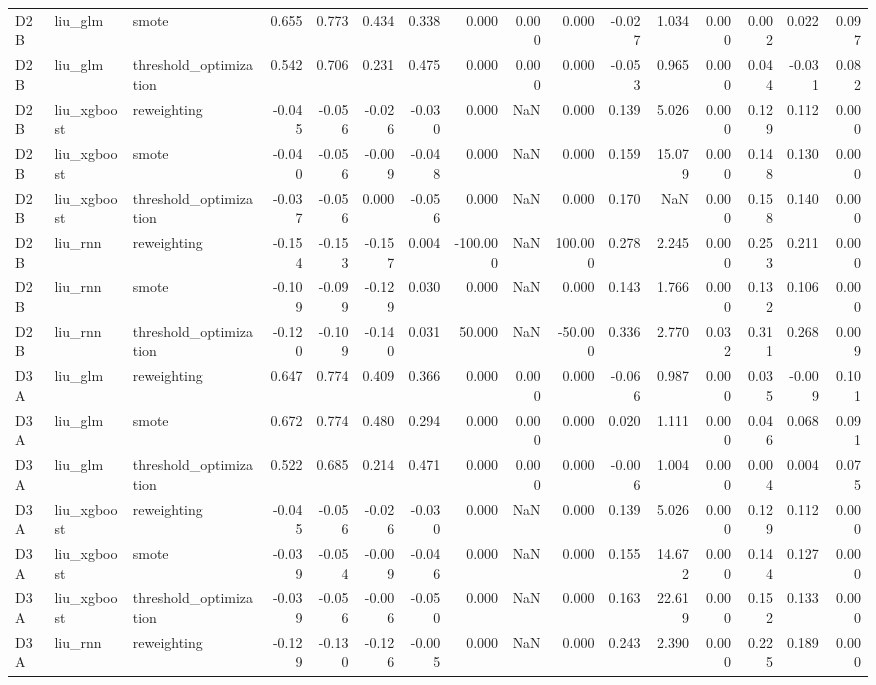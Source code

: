 \begin{tabular}{lllrrrrrrrrrrrrr}
D2B & liu_glm & smote & 0.655 & 0.773 & 0.434 & 0.338 & 0.000 & 0.000 & 0.000 & -0.027 & 1.034 & 0.000 & 0.002 & 0.022 & 0.097 \\
D2B & liu_glm & threshold_optimization & 0.542 & 0.706 & 0.231 & 0.475 & 0.000 & 0.000 & 0.000 & -0.053 & 0.965 & 0.000 & 0.044 & -0.031 & 0.082 \\
D2B & liu_xgboost & reweighting & -0.045 & -0.056 & -0.026 & -0.030 & 0.000 & NaN & 0.000 & 0.139 & 5.026 & 0.000 & 0.129 & 0.112 & 0.000 \\
D2B & liu_xgboost & smote & -0.040 & -0.056 & -0.009 & -0.048 & 0.000 & NaN & 0.000 & 0.159 & 15.079 & 0.000 & 0.148 & 0.130 & 0.000 \\
D2B & liu_xgboost & threshold_optimization & -0.037 & -0.056 & 0.000 & -0.056 & 0.000 & NaN & 0.000 & 0.170 & NaN & 0.000 & 0.158 & 0.140 & 0.000 \\
D2B & liu_rnn & reweighting & -0.154 & -0.153 & -0.157 & 0.004 & -100.000 & NaN & 100.000 & 0.278 & 2.245 & 0.000 & 0.253 & 0.211 & 0.000 \\
D2B & liu_rnn & smote & -0.109 & -0.099 & -0.129 & 0.030 & 0.000 & NaN & 0.000 & 0.143 & 1.766 & 0.000 & 0.132 & 0.106 & 0.000 \\
D2B & liu_rnn & threshold_optimization & -0.120 & -0.109 & -0.140 & 0.031 & 50.000 & NaN & -50.000 & 0.336 & 2.770 & 0.032 & 0.311 & 0.268 & 0.009 \\
D3A & liu_glm & reweighting & 0.647 & 0.774 & 0.409 & 0.366 & 0.000 & 0.000 & 0.000 & -0.066 & 0.987 & 0.000 & 0.035 & -0.009 & 0.101 \\
D3A & liu_glm & smote & 0.672 & 0.774 & 0.480 & 0.294 & 0.000 & 0.000 & 0.000 & 0.020 & 1.111 & 0.000 & 0.046 & 0.068 & 0.091 \\
D3A & liu_glm & threshold_optimization & 0.522 & 0.685 & 0.214 & 0.471 & 0.000 & 0.000 & 0.000 & -0.006 & 1.004 & 0.000 & 0.004 & 0.004 & 0.075 \\
D3A & liu_xgboost & reweighting & -0.045 & -0.056 & -0.026 & -0.030 & 0.000 & NaN & 0.000 & 0.139 & 5.026 & 0.000 & 0.129 & 0.112 & 0.000 \\
D3A & liu_xgboost & smote & -0.039 & -0.054 & -0.009 & -0.046 & 0.000 & NaN & 0.000 & 0.155 & 14.672 & 0.000 & 0.144 & 0.127 & 0.000 \\
D3A & liu_xgboost & threshold_optimization & -0.039 & -0.056 & -0.006 & -0.050 & 0.000 & NaN & 0.000 & 0.163 & 22.619 & 0.000 & 0.152 & 0.133 & 0.000 \\
D3A & liu_rnn & reweighting & -0.129 & -0.130 & -0.126 & -0.005 & 0.000 & NaN & 0.000 & 0.243 & 2.390 & 0.000 & 0.225 & 0.189 & 0.000 \\

\end{tabular}
